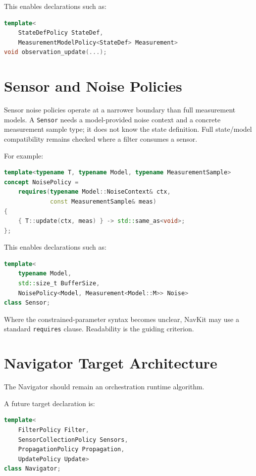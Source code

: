 \documentclass[11pt]{article}
\begin{document}
This enables declarations such as:

\begin{lstlisting}[language=C++]
template<
    StateDefPolicy StateDef,
    MeasurementModelPolicy<StateDef> Measurement>
void observation_update(...);
\end{lstlisting}

\section{Sensor and Noise Policies}

Sensor noise policies operate at a narrower boundary than full measurement
models. A \texttt{Sensor} needs a model-provided noise context and a concrete
measurement sample type; it does not know the state definition. Full
state/model compatibility remains checked where a filter consumes a sensor.

For example:

\begin{lstlisting}[language=C++]
template<typename T, typename Model, typename MeasurementSample>
concept NoisePolicy =
    requires(typename Model::NoiseContext& ctx,
             const MeasurementSample& meas)
{
    { T::update(ctx, meas) } -> std::same_as<void>;
};
\end{lstlisting}

This enables declarations such as:

\begin{lstlisting}[language=C++]
template<
    typename Model,
    std::size_t BufferSize,
    NoisePolicy<Model, Measurement<Model::M>> Noise>
class Sensor;
\end{lstlisting}

Where the constrained-parameter syntax becomes unclear, NavKit may use a
standard \texttt{requires} clause. Readability is the guiding criterion.

\section{Navigator Target Architecture}

The Navigator should remain an orchestration runtime algorithm.

A future target declaration is:

\begin{lstlisting}[language=C++]
template<
    FilterPolicy Filter,
    SensorCollectionPolicy Sensors,
    PropagationPolicy Propagation,
    UpdatePolicy Update>
class Navigator;
\end{lstlisting}
\end{document}
